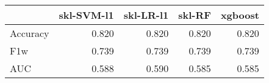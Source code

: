 \begin{tabular}{lrrrr}
\toprule
{} &  skl-SVM-l1 &  skl-LR-l1 &  skl-RF &  xgboost \\
\midrule
Accuracy &       0.820 &      0.820 &   0.820 &    0.820 \\
F1w      &       0.739 &      0.739 &   0.739 &    0.739 \\
AUC      &       0.588 &      0.590 &   0.585 &    0.585 \\
\bottomrule
\end{tabular}
